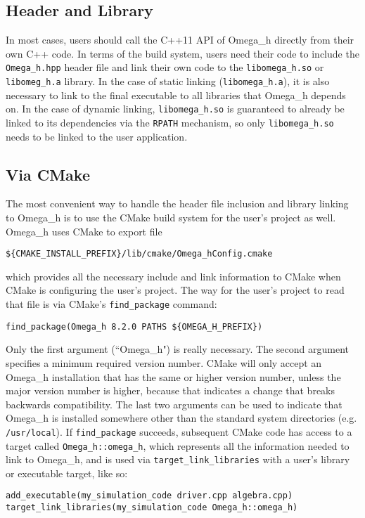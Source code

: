 \documentclass{article}
\begin{document}
\subsection{Header and Library}

In most cases, users should call the C++11 API of Omega\_h directly
from their own C++ code.
In terms of the build system, users need their code to include
the \texttt{Omega\_h.hpp} header file and link their own code
to the \texttt{libomega\_h.so} or \texttt{libomeg\_h.a} library.
In the case of static linking (\texttt{libomega\_h.a}), it is
also necessary to link to the final executable to all libraries
that Omega\_h depends on.
In the case of dynamic linking, \texttt{libomega\_h.so} is guaranteed
to already be linked to its dependencies via the \texttt{RPATH}
mechanism, so only \texttt{libomega\_h.so} needs to be linked
to the user application.

\subsection{Via CMake}

The most convenient way to handle the header file inclusion
and library linking to Omega\_h is to use the CMake build system
for the user's project as well.
Omega\_h uses CMake to export file

\texttt{\$\{CMAKE\_INSTALL\_PREFIX\}/lib/cmake/Omega\_hConfig.cmake}

which provides all the necessary include and link information
to CMake when CMake is configuring the user's project.
The way for the user's project to read that file is via
CMake's \texttt{find\_package} command:

\begin{lstlisting}
find_package(Omega_h 8.2.0 PATHS ${OMEGA_H_PREFIX})
\end{lstlisting}

Only the first argument (``Omega\_h") is really necessary.
The second argument specifies a minimum required version number.
CMake will only accept an Omega\_h installation that has
the same or higher version number, unless the major version number
is higher, because that indicates a change that breaks backwards
compatibility.
The last two arguments can be used to indicate that Omega\_h
is installed somewhere other than the standard system directories
(e.g. \texttt{/usr/local}).
If \texttt{find\_package} succeeds, subsequent CMake code has
access to a target called \texttt{Omega\_h::omega\_h}, which
represents all the information needed to link to Omega\_h,
and is used via \texttt{target\_link\_libraries} with a user's
library or executable target, like so:
\begin{lstlisting}
add_executable(my_simulation_code driver.cpp algebra.cpp)
target_link_libraries(my_simulation_code Omega_h::omega_h)
\end{lstlisting}
\end{document}
